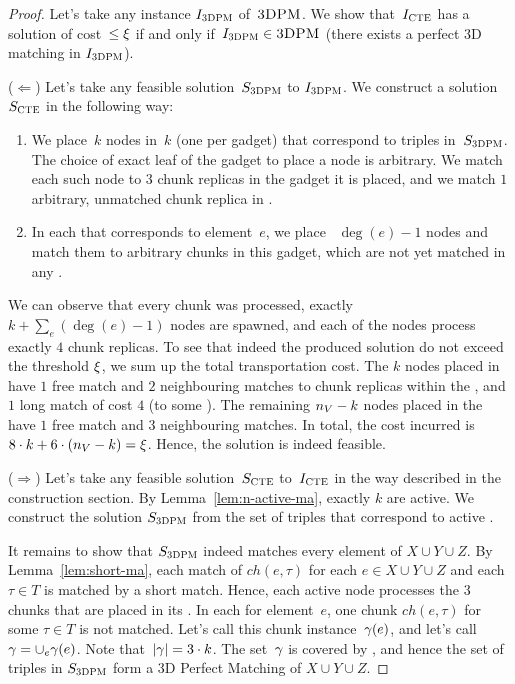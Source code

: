 \begin{proof}
  
  Let's take any instance $I_{\mathrm{\textsc{3DPM}}}$ of~$\textsc{3DPM}$.
  We show that~$I_{\mathrm{\textsc{CTE}}}$ has a solution of cost~$\leq \xi$ if and only if~$I_{\mathrm{\textsc{3DPM}}} \in \textsc{3DPM}$ (there exists a perfect 3D matching in $I_{\mathrm{\textsc{3DPM}}}$).

  ($\Leftarrow$) Let's take any feasible solution~$S_{\mathrm{\textsc{3DPM}}}$ to $I_{\mathrm{\textsc{3DPM}}}$.
  We construct a solution~$S_{\mathrm{\textsc{CTE}}}$ in the following way:
  \begin{enumerate}
    \item We place~$k$ nodes in~$k$ {\TripleGadgets} (one per gadget) that correspond to triples in~$S_{\mathrm{\textsc{3DPM}}}$.
    The choice of exact leaf of the gadget to place a node is arbitrary.
    We match each such node to $3$ chunk replicas in the gadget it is placed, and we match $1$ arbitrary, unmatched chunk replica in {\UnqSubtree}.
    \item In each {\ElGadget} that corresponds to element~$e$, we place
   ~$\deg(e) - 1$ nodes and match them to arbitrary chunks in this
    gadget, which are not yet matched in any {\TripleGadget}.
  \end{enumerate}

  We can observe that every chunk was processed, exactly $k + \sum_e(\deg(e) - 1)$ nodes are spawned, and each of the nodes process exactly $4$ chunk replicas.
  To see that indeed the produced solution do not exceed the threshold $\xi$, we sum up the total transportation cost.
  The $k$ nodes placed in \TripleGadgets{} have $1$ free match and $2$ neighbouring matches to chunk replicas within the \TripleGadget{}, and $1$ long match of cost $4$ (to some \UnqGadget{}).
  The remaining $n_V-k$ nodes placed in the \CoverSubtree{} have $1$ free match and $3$ neighbouring matches.
  In total, the cost incurred is $8\cdot k + 6\cdot (n_V - k) = \xi$.
  Hence, the solution is indeed feasible.

  ($\Rightarrow$) Let's take any feasible solution~$S_{\mathrm{\textsc{CTE}}}$ to~$I_{\mathrm{\textsc{CTE}}}$ in the way described in the construction section.
  By Lemma~\ref{lem:n-active-ma}, exactly $k$ \TripleGadgets{} are active.
  We construct the solution $S_{\mathrm{\textsc{3DPM}}}$ from the set of triples that correspond to active \TripleGadgets{}.

  It remains to show that $S_{\mathrm{\textsc{3DPM}}}$ indeed matches every element of $X\cup Y\cup Z$.
  By Lemma~\ref{lem:short-ma}, each match of $ch(e, \tau)$ for each $e\in X\cup Y\cup Z$ and each $\tau \in T$ is matched by a short match.
  Hence, each active node processes the 3 chunks that are placed in its \TripleGadget.
  In each {\ElGadget} for element~$e$, one chunk $ch(e, \tau)$ for some $\tau \in T$ is not matched.
  Let's call this chunk instance~$\gamma(e)$, and let's call~$\gamma = \cup_e \gamma(e)$.
  Note that~$|\gamma| = 3\cdot k$.
  The set~$\gamma$ is covered by \ActiveNodes{}, and hence the set of triples in $S_{\mathrm{\textsc{3DPM}}}$ form a 3D Perfect Matching of $X\cup Y\cup Z$.
\end{proof}


